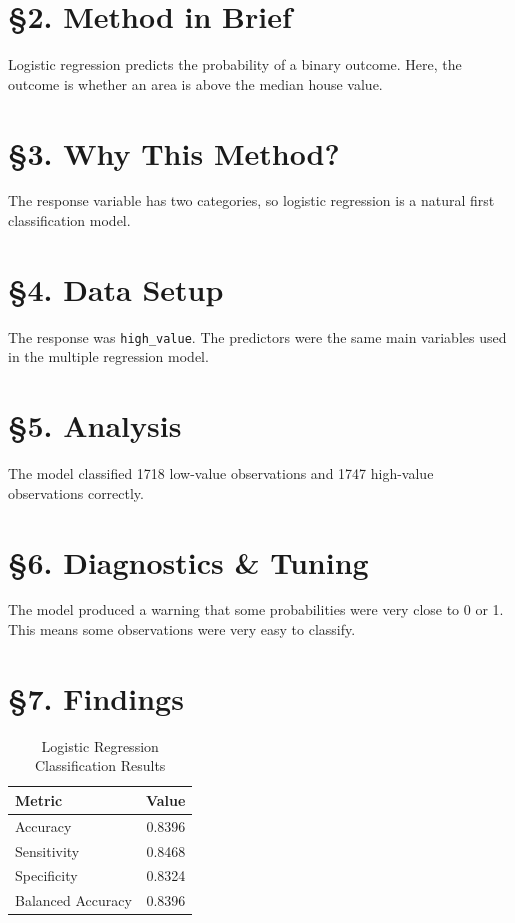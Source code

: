 \documentclass[12pt]{report}
\begin{document}
\section*{\S2. Method in Brief}
Logistic regression predicts the probability of a binary outcome. Here, the outcome is whether an area is above the median house value.

\section*{\S3. Why This Method?}
The response variable has two categories, so logistic regression is a natural first classification model.

\section*{\S4. Data Setup}
The response was \texttt{high\_value}. The predictors were the same main variables used in the multiple regression model.

\section*{\S5. Analysis}
The model classified 1718 low-value observations and 1747 high-value observations correctly.

\section*{\S6. Diagnostics \& Tuning}
The model produced a warning that some probabilities were very close to 0 or 1. This means some observations were very easy to classify.

\section*{\S7. Findings}

\begin{table}[H]
\centering
\caption{Logistic Regression Classification Results}
\begin{tabular}{lr}
\toprule
Metric & Value \\
\midrule
Accuracy & 0.8396 \\
Sensitivity & 0.8468 \\
Specificity & 0.8324 \\
Balanced Accuracy & 0.8396 \\
\bottomrule
\end{tabular}
\end{table}
\end{document}
